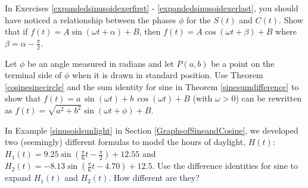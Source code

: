 \documentclass{ximera}
\begin{document}
\begin{problem}\label{sinusoidexercise1}
    In Exercises \ref{expandedsinusoidexerfirst} - \ref{expandedsinusoidexerlast}, you should have noticed a relationship between the phases $\phi$ for the $S(t)$ and $C(t)$.  Show that if $f(t) = A \sin(\omega t + \alpha) + B$, then $f(t) = A \cos(\omega t + \beta) + B$ where $\beta = \alpha - \frac{\pi}{2}$. 
\end{problem}

\begin{problem}\label{sinusoidexercise2}
    Let $\phi$ be an angle measured in radians and let $P(a,b)$ be a point on the terminal side of $\phi$ when it is drawn in standard position.  Use Theorem \ref{cosinesinecircle} and the sum identity for sine in Theorem \ref{sinesumdifference} to show that  $f(t) = a \, \sin(\omega t) + b\, \cos(\omega t) + B$ (with  $\omega > 0$) can be rewritten as $f(t) = \sqrt{a^{2} + b^{2}}\sin(\omega t + \phi) + B$.
\end{problem}

\begin{problem}\label{twodaylightfunctions}
    In Example \ref{sinusoidsunlight} in Section \ref{GraphsofSineandCosine}, we developed two (seemingly) different formulas to model the hours of daylight, $H(t)$:   $H_{1}(t) = 9.25 \sin\left(\frac{\pi}{6} t - \frac{\pi}{2}\right) + 12.55$ and  $H_{2}(t) = -8.13 \sin\left(\frac{\pi}{6} t - 4.70\right)+ 12.5$.  Use the difference identities for sine to expand $H_{1}(t)$ and $H_{2}(t)$.  How different are they?
\end{problem}
\end{document}
